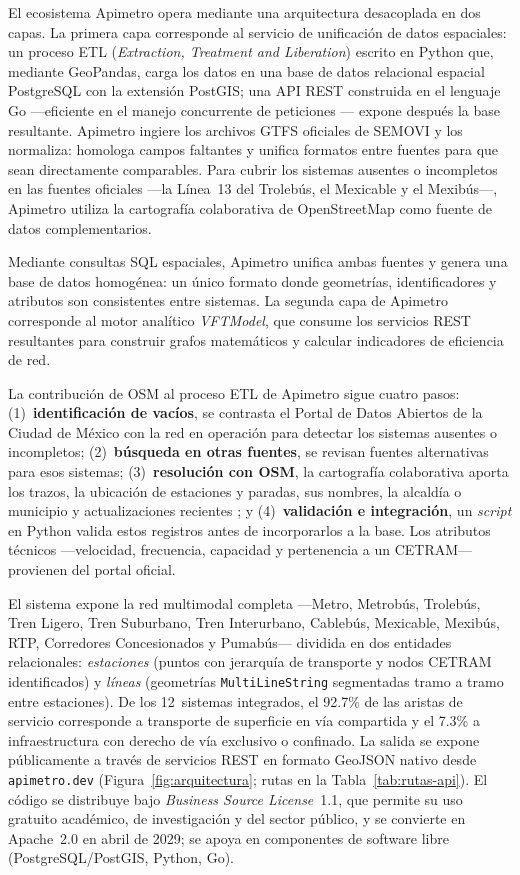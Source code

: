 \documentclass{isprs} %
\begin{document}
El ecosistema Apimetro opera mediante una arquitectura desacoplada en dos capas.
La primera capa corresponde al servicio de unificación de datos espaciales: un
proceso ETL (\textit{Extraction, Treatment and Liberation}) escrito en Python que,
mediante GeoPandas, carga los datos en una base de datos relacional espacial
PostgreSQL con la extensión PostGIS; una API REST construida en el lenguaje Go
---eficiente en el manejo concurrente de peticiones \citep{goauthors2025}--- expone
después la base resultante.  Apimetro
ingiere los archivos GTFS oficiales de SEMOVI y los normaliza: homologa
campos faltantes y unifica formatos entre fuentes para que sean
directamente comparables.  Para cubrir los sistemas ausentes o incompletos en las
fuentes oficiales ---la Línea~13 del Trolebús, el Mexicable y el Mexibús---,
Apimetro utiliza la cartografía colaborativa de OpenStreetMap como fuente de datos
complementarios.

Mediante consultas SQL espaciales, Apimetro unifica ambas fuentes y genera
una base de datos homogénea: un único formato donde geometrías,
identificadores y atributos son consistentes entre sistemas.  La segunda capa de Apimetro corresponde al motor
analítico \textit{VFTModel}, que consume los servicios REST resultantes para
construir grafos matemáticos y calcular indicadores de eficiencia de red.

La contribución de OSM al proceso ETL de Apimetro sigue cuatro pasos:
(1)~\textbf{identificación de vacíos}, se contrasta el Portal de Datos Abiertos de
la Ciudad de México con la red en operación para detectar los sistemas ausentes o
incompletos; (2)~\textbf{búsqueda en otras fuentes}, se revisan fuentes
alternativas para esos sistemas; (3)~\textbf{resolución con OSM}, la cartografía
colaborativa aporta los trazos, la ubicación de estaciones y paradas, sus nombres,
la alcaldía o municipio y actualizaciones recientes
\citep{haklay2010good, neis2012street}; y (4)~\textbf{validación e integración},
un \textit{script} en Python valida estos registros antes de incorporarlos a la
base.  Los atributos técnicos ---velocidad, frecuencia, capacidad y pertenencia a
un CETRAM--- provienen del portal oficial.

El sistema expone la red multimodal completa ---Metro, Metrobús, Trolebús, Tren
Ligero, Tren Suburbano, Tren Interurbano, Cablebús, Mexicable, Mexibús, RTP,
Corredores Concesionados y Pumabús--- dividida en dos entidades relacionales:
\textit{estaciones} (puntos con jerarquía de transporte y nodos CETRAM
identificados) y \textit{líneas} (geometrías \texttt{MultiLineString} segmentadas
tramo a tramo entre estaciones).  De los 12~sistemas integrados, el 92.7\% de las
aristas de servicio corresponde a transporte de superficie en vía compartida y el
7.3\% a infraestructura con derecho de vía exclusivo o confinado.  La salida
se expone públicamente a través de servicios REST en formato GeoJSON nativo
desde \texttt{apimetro.dev} (Figura~\ref{fig:arquitectura}; rutas en la
Tabla~\ref{tab:rutas-api}).  El código se distribuye bajo \textit{Business Source
License}~1.1, que permite su uso gratuito académico, de investigación y del sector
público, y se convierte en Apache~2.0 en abril de 2029; se apoya en componentes de
software libre (PostgreSQL/PostGIS, Python, Go).
\end{document}
